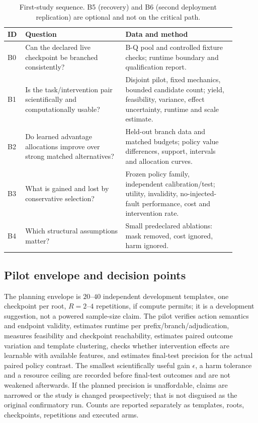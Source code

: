 \begin{table}[t]
\centering
\small
\setlength{\tabcolsep}{4pt}
\begin{tabular}{@{}p{0.06\linewidth}p{0.40\linewidth}p{0.44\linewidth}@{}}
\toprule
ID & Question & Data and method \\
\midrule
B0 & Can the declared live checkpoint be branched consistently? & B-Q pool and
controlled fixture checks; runtime boundary and qualification report. \\
B1 & Is the task/intervention pair scientifically and computationally usable? &
Disjoint pilot, fixed mechanics, bounded candidate count; yield, feasibility,
variance, effect uncertainty, runtime and scale estimate. \\
B2 & Do learned advantage allocations improve over strong matched alternatives? &
Held-out branch data and matched budgets; policy value differences, support,
intervals and allocation curves. \\
B3 & What is gained and lost by conservative selection? & Frozen policy family,
independent calibration/test; utility, invalidity, no-injected-fault
performance, cost and intervention rate. \\
B4 & Which structural assumptions matter? & Small predeclared ablations: mask
removed, cost ignored, harm ignored. \\
\bottomrule
\end{tabular}
\caption{First-study sequence.  B5 (recovery) and B6 (second deployment
replication) are optional and not on the critical path.}
\label{tab:b-studies}
\end{table}

\subsection{Pilot envelope and decision points}

The planning envelope is $20$--$40$ independent development templates, one
checkpoint per root, $R=2$--$4$ repetitions, if compute permits; it is a
development suggestion, not a powered sample-size claim.  The pilot verifies
action semantics and endpoint validity, estimates runtime per
prefix/branch/adjudication, measures feasibility and checkpoint reachability,
estimates paired outcome variation and template clustering, checks whether
intervention effects are learnable with available features, and estimates
final-test precision for the actual paired policy contrast.  The smallest
scientifically useful gain $\epsilon$, a harm tolerance and a resource ceiling
are recorded before final-test outcomes and are not weakened afterwards.  If
the planned precision is unaffordable, claims are narrowed or the study is
changed prospectively; that is not disguised as the original confirmatory run.
Counts are reported separately as templates, roots, checkpoints, repetitions
and executed arms.

